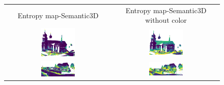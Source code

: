     \begin{figure}[h!]
        \centering
        \begin{tabular}{cc}
            Entropy map-Semantic3D & Entropy map-Semantic3D without color \\
            \includegraphics[width=0.33\textwidth, height=0.18\textheight]{images/ood_imgs/fout_sem3d/fout_ent_1.png}&
            \includegraphics[width=0.33\textwidth, height=0.18\textheight]{images/sem3d_of/fout_ent_sem3d_of_1.png}\\

            \includegraphics[width=0.33\textwidth, height=0.18\textheight]{images/ood_imgs/fout_sem3d/fout_ent_2.png}&
            \includegraphics[width=0.33\textwidth, height=0.18\textheight]{images/sem3d_of/fout_ent_sem3d_of_2.png}\\


\end{tabular}
\end{figure}

